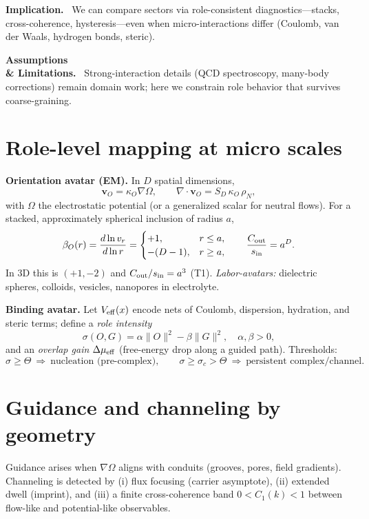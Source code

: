 \documentclass[12pt,a4paper,oneside]{scrreprt}
\newenvironment{implication}{\par\vspace{0.5em}\noindent\textbf{Implication.}\ }{\par\vspace{0.5em}}
\newenvironment{limitation}{\par\vspace{0.5em}\noindent\textbf{Assumptions \\ \& Limitations.}\ }{\par\vspace{0.5em}}
\begin{document}
\begin{implication}
We can compare sectors via role-consistent diagnostics—stacks, cross-coherence, hysteresis—even when micro-interactions differ (Coulomb, van der Waals, hydrogen bonds, steric).
\end{implication}

\begin{limitation}
Strong-interaction details (QCD spectroscopy, many-body corrections) remain domain work; here we constrain role behavior that survives coarse-graining.
\end{limitation}

\section{Role-level mapping at micro scales}\label{sec:micro-mapping}
\textbf{Orientation avatar (EM).} In $D$ spatial dimensions,
\[
\mathbf v_O=\kappa_O\nabla\Omega,\qquad \nabla\!\cdot\mathbf v_O=S_D\,\kappa_O\,\rho_N,
\]
with $\Omega$ the electrostatic potential (or a generalized scalar for neutral flows). For a stacked, approximately spherical inclusion of radius $a$,
\begin{equation}
\beta_O(r)=\frac{d\ln v_r}{d\ln r}=\begin{cases}+1,& r\le a,\\ -(D-1),& r\ge a,\end{cases}\qquad
\frac{C_{\rm out}}{s_{\rm in}}=a^{D}.
\end{equation}
In 3D this is $(+1,-2)$ and $C_{\rm out}/s_{\rm in}=a^3$ (T1). \emph{Labor-avatars:} dielectric spheres, colloids, vesicles, nanopores in electrolyte.

\textbf{Binding avatar.} Let $V_{\rm eff}(x)$ encode nets of Coulomb, dispersion, hydration, and steric terms; define a \emph{role intensity}
\[
\sigma(O,G)=\alpha\|O\|^2-\beta\|G\|^2,\quad \alpha,\beta>0,
\]
and an \emph{overlap gain} $\Delta\mu_{\rm eff}$ (free-energy drop along a guided path). Thresholds:
\[
\sigma\ge\Theta\ \Rightarrow\ \text{nucleation (pre-complex)},\qquad
\sigma\ge\sigma_c>\Theta\ \Rightarrow\ \text{persistent complex/channel}.
\]

\section{Guidance and channeling by geometry}\label{sec:micro-channeling}
Guidance arises when $\nabla\Omega$ aligns with conduits (grooves, pores, field gradients). Channeling is detected by (i) flux focusing (carrier asymptote), (ii) extended dwell (imprint), and (iii) a finite cross-coherence band $0<C_1(k)<1$ between flow-like and potential-like observables.
\end{document}
